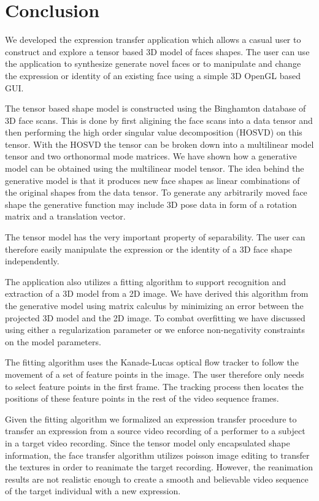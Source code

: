 \documentclass[11pt,a4paper,twoside]{report}
\begin{document}
\chapter{Conclusion}
We developed the expression transfer application which allows a
casual user to construct and explore a tensor based 3D model of faces shapes. The user
can use the application to synthesize generate novel faces or to manipulate and
change the expression or identity of an existing face using a simple 3D OpenGL
based GUI. 

The tensor based shape model is constructed using the Binghamton database of 3D face
scans. This is done by first aligining the face scans into a data tensor and
then performing the high order singular value decomposition (HOSVD) on this
tensor. With the HOSVD the tensor can be broken down into a multilinear model
tensor and two orthonormal mode matrices. We have shown how a generative model
can be obtained using the multilinear model tensor. The idea behind the
generative model is that it produces new face shapes as linear combinations of
the original shapes from the data tensor. To generate any arbitrarily moved face
shape the generative function may include 3D pose data in form of a rotation
matrix and a translation vector.

The tensor model has the very important property of separability. The user can
therefore easily manipulate the expression or the identity of a 3D face shape
independently.

The application also utilizes a fitting algorithm to support
recognition and extraction of a 3D model from a 2D image. We have derived this
algorithm from the generative model using matrix calculus by minimizing an error
between the projected 3D model and the 2D image. To combat overfitting
we have discussed using either a regularization
parameter or we enforce non-negativity constraints on the model parameters. 

The fitting algorithm uses the Kanade-Lucas optical flow tracker to follow the
movement of a set of feature points in the image. The user therefore only needs
to select feature points in the first frame. The tracking process then locates
the positions of these feature points in the rest of the video sequence frames.

Given the fitting algorithm we formalized an expression transfer procedure to
transfer an expression from a source video recording of a performer to a subject
in a target video recording. Since the tensor model only encapsulated shape
information, the face transfer algorithm utilizes poisson image
editing to transfer the textures in order to reanimate the target
recording. However, the reanimation results are not realistic enough to create a
smooth and believable video sequence of the target individual with a new
expression. 
\end{document}
